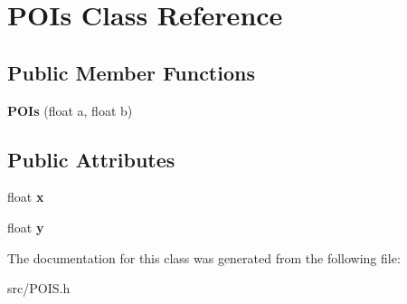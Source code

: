\hypertarget{class_p_o_is}{\section{P\-O\-Is Class Reference}
\label{class_p_o_is}
}
\subsection*{Public Member Functions}
\begin{DoxyCompactItemize}
\item 
\hypertarget{class_p_o_is_a2c909087b597c664dbd783ae35e3857c}{{\bfseries P\-O\-Is} (float a, float b)}\label{class_p_o_is_a2c909087b597c664dbd783ae35e3857c}

\end{DoxyCompactItemize}
\subsection*{Public Attributes}
\begin{DoxyCompactItemize}
\item 
\hypertarget{class_p_o_is_a58b63302374009b8d4c040d0656ccbbe}{float {\bfseries x}}\label{class_p_o_is_a58b63302374009b8d4c040d0656ccbbe}

\item 
\hypertarget{class_p_o_is_ade2e0f7d8b5da90d4824ce6a8b240a0f}{float {\bfseries y}}\label{class_p_o_is_ade2e0f7d8b5da90d4824ce6a8b240a0f}

\end{DoxyCompactItemize}


The documentation for this class was generated from the following file\-:\begin{DoxyCompactItemize}
\item 
src/P\-O\-I\-S.\-h\end{DoxyCompactItemize}
